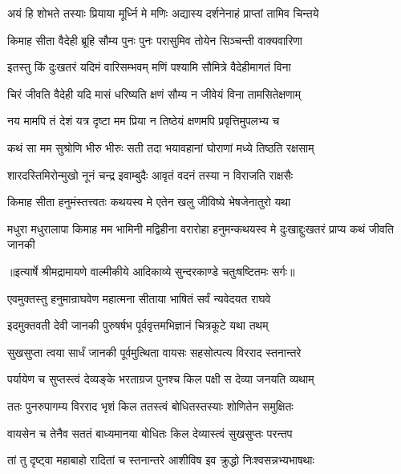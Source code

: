 \twolineshloka
{अयं हि शोभते तस्याः प्रियाया मूर्ध्नि मे मणिः}
{अद्यास्य दर्शनेनाहं प्राप्तां तामिव चिन्तये} %

\twolineshloka
{किमाह सीता वैदेही ब्रूहि सौम्य पुनः पुनः}
{परासुमिव तोयेन सिञ्चन्ती वाक्यवारिणा} %

\twolineshloka
{इतस्तु किं दुःखतरं यदिमं वारिसम्भवम्}
{मणिं पश्यामि सौमित्रे वैदेहीमागतं विना} %

\twolineshloka
{चिरं जीवति वैदेही यदि मासं धरिष्यति}
{क्षणं सौम्य न जीवेयं विना तामसितेक्षणाम्} %

\twolineshloka
{नय मामपि तं देशं यत्र दृष्टा मम प्रिया}
{न तिष्ठेयं क्षणमपि प्रवृत्तिमुपलभ्य च} %

\twolineshloka
{कथं सा मम सुश्रोणि भीरु भीरुः सती तदा}
{भयावहानां घोराणां मध्ये तिष्ठति रक्षसाम्} %

\twolineshloka
{शारदस्तिमिरोन्मुखो नूनं चन्द्र इवाम्बुदैः}
{आवृतं वदनं तस्या न विराजति राक्षसैः} %

\twolineshloka
{किमाह सीता हनुमंस्तत्त्वतः कथयस्व मे}
{एतेन खलु जीविष्ये भेषजेनातुरो यथा} %

\threelineshloka
{मधुरा मधुरालापा किमाह मम भामिनी}
{मद्विहीना वरारोहा हनुमन्कथयस्व मे}
{दुःखाद्दुःखतरं प्राप्य कथं जीवति जानकी} %


{॥इत्यार्षे श्रीमद्रामायणे वाल्मीकीये आदिकाव्ये सुन्दरकाण्डे चतुःषष्टितमः सर्गः॥}


\twolineshloka
{एवमुक्तस्तु हनुमान्राघवेण महात्मना}
{सीताया भाषितं सर्वं न्यवेदयत राघवे} %

\twolineshloka
{इदमुक्तवती देवी जानकी पुरुषर्षभ}
{पूर्ववृत्तमभिज्ञानं चित्रकूटे यथा तथम्} %

\twolineshloka
{सुखसुप्ता त्वया सार्धं जानकी पूर्वमुत्थिता}
{वायसः सहसोत्पत्य विरराद स्तनान्तरे} %

\twolineshloka
{पर्यायेण च सुप्तस्त्वं देव्यङ्के भरताग्रज}
{पुनश्च किल पक्षी स देव्या जनयति व्यथाम्} %

\twolineshloka
{ततः पुनरुपागम्य विरराद भृशं किल}
{ततस्त्वं बोधितस्तस्याः शोणितेन समुक्षितः} %

\twolineshloka
{वायसेन च तेनैव सततं बाध्यमानया}
{बोधितः किल देव्यास्त्वं सुखसुप्तः परन्तप} %

\twolineshloka
{तां तु दृष्ट्वा महाबाहो रादितां च स्तनान्तरे}
{आशीविष इव क्रुद्धो निःश्वसन्नभ्यभाषथाः} %

